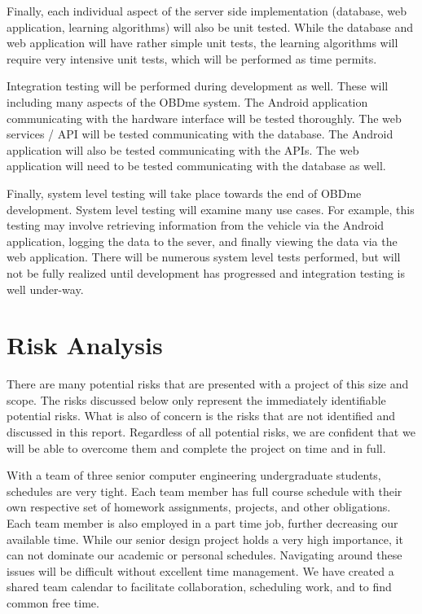 \documentclass[12pt]{article}
\begin{document}
Finally, each individual aspect of the server side implementation (database, web application, learning algorithms) will also be unit tested.  While the database and web application will have rather simple unit tests, the learning algorithms will require very intensive unit tests, which will be performed as time permits.

Integration testing will be performed during development as well.  These will including many aspects of the OBDme system.  The Android application communicating with the hardware interface will be tested thoroughly.  The web services / API will be tested communicating with the database.  The Android application will also be tested communicating with the APIs.  The web application will need to be tested communicating with the database as well.

Finally, system level testing will take place towards the end of OBDme development.  System level testing will examine many use cases.  For example, this testing may involve retrieving information from the vehicle via the Android application, logging the data to the sever, and finally viewing the data via the web application.  There will be numerous system level tests performed, but will not be fully realized until development has progressed and integration testing is well under-way.

\section{Risk Analysis}\label{sec:RiskAnalysis}

There are many potential risks that are presented with a project of this size and scope.   The risks discussed below only represent the immediately identifiable potential risks.  What is also of concern is the risks that are not identified and discussed in this report.  Regardless of all potential risks, we are confident that we will be able to overcome them and complete the project on time and in full.

With a team of three senior computer engineering undergraduate students, schedules are very tight.  Each team member has full course schedule with their own respective set of homework assignments, projects, and other obligations.  Each team member is also employed in a part time job, further decreasing our available time.  While our senior design project holds a very high importance, it can not dominate our academic or personal schedules.  Navigating around these issues will be difficult without excellent time management.  We have created a shared team calendar to facilitate collaboration, scheduling work, and to find common free time.
\end{document}
